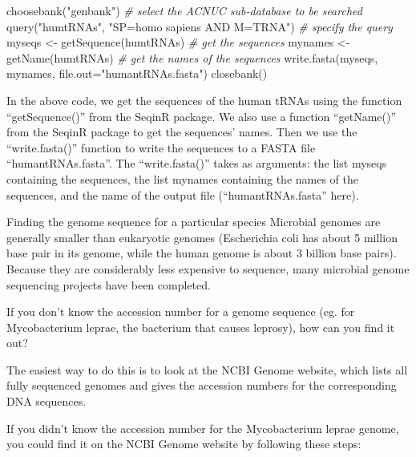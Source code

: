 \documentclass[
]{book}
\newenvironment{Shaded}{\begin{snugshade}}{\end{snugshade}}
\newcommand{\AttributeTok}[1]{\textcolor[rgb]{0.77,0.63,0.00}{#1}}
\newcommand{\CommentTok}[1]{\textcolor[rgb]{0.56,0.35,0.01}{\textit{#1}}}
\newcommand{\FunctionTok}[1]{\textcolor[rgb]{0.00,0.00,0.00}{#1}}
\newcommand{\NormalTok}[1]{#1}
\newcommand{\OtherTok}[1]{\textcolor[rgb]{0.56,0.35,0.01}{#1}}
\newcommand{\StringTok}[1]{\textcolor[rgb]{0.31,0.60,0.02}{#1}}
\begin{document}
\begin{Shaded}
\begin{Highlighting}[]
\FunctionTok{choosebank}\NormalTok{(}\StringTok{"genbank"}\NormalTok{)                             }\CommentTok{\# select the ACNUC sub{-}database to be searched}
\FunctionTok{query}\NormalTok{(}\StringTok{"humtRNAs"}\NormalTok{, }\StringTok{"SP=homo sapiens AND M=TRNA"}\NormalTok{)   }\CommentTok{\# specify the query}
\NormalTok{myseqs }\OtherTok{\textless{}{-}} \FunctionTok{getSequence}\NormalTok{(humtRNAs)                   }\CommentTok{\# get the sequences}
\NormalTok{mynames }\OtherTok{\textless{}{-}} \FunctionTok{getName}\NormalTok{(humtRNAs)                      }\CommentTok{\# get the names of the sequences}
\FunctionTok{write.fasta}\NormalTok{(myseqs, mynames, }\AttributeTok{file.out=}\StringTok{"humantRNAs.fasta"}\NormalTok{)}
\FunctionTok{closebank}\NormalTok{()}
\end{Highlighting}
\end{Shaded}

In the above code, we get the sequences of the human tRNAs using the function ``getSequence()'' from the SeqinR package. We also use a function ``getName()'' from the SeqinR package to get the sequences' names. Then we use the ``write.fasta()'' function to write the sequences to a FASTA file ``humantRNAs.fasta''. The ``write.fasta()'' takes as arguments: the list myseqs containing the sequences, the list mynames containing the names of the sequences, and the name of the output file (``humantRNAs.fasta'' here).

Finding the genome sequence for a particular species
Microbial genomes are generally smaller than eukaryotic genomes (Escherichia coli has about 5 million base pair in its genome, while the human genome is about 3 billion base pairs). Because they are considerably less expensive to sequence, many microbial genome sequencing projects have been completed.

If you don't know the accession number for a genome sequence (eg. for Mycobacterium leprae, the bacterium that causes leprosy), how can you find it out?

The easiest way to do this is to look at the NCBI Genome website, which lists all fully sequenced genomes and gives the accession numbers for the corresponding DNA sequences.

If you didn't know the accession number for the Mycobacterium leprae genome, you could find it on the NCBI Genome website by following these steps:
\end{document}
